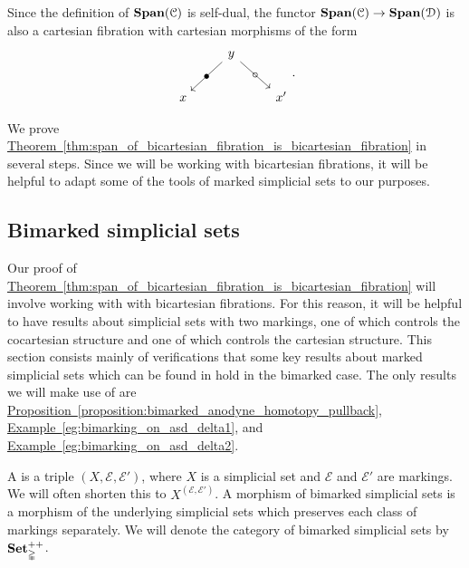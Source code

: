 \documentclass[main.tex]{subfiles}
\begin{document}
\begin{note}
  Since the definition of $\mathbf{Span}(\mathcal{C})$ is self-dual, the functor $\mathbf{Span}(\mathcal{C}) \to \mathbf{Span}(\mathcal{D})$ is also a cartesian fibration with cartesian morphisms of the form
  \begin{equation*}
    \begin{tikzcd}
      & y
      \arrow[dl, "\bullet" marking]
      \arrow[dr, "\circ" marking]
      \\
      x
      && x'
    \end{tikzcd}.
  \end{equation*}
\end{note}

We prove \hyperref[thm:span_of_bicartesian_fibration_is_bicartesian_fibration]{Theorem~\ref*{thm:span_of_bicartesian_fibration_is_bicartesian_fibration}} in several steps. Since we will be working with bicartesian fibrations, it will be helpful to adapt some of the tools of marked simplicial sets to our purposes.

\subsection{Bimarked simplicial sets}
\label{ssc:bimarked_simplicial_sets}

Our proof of \hyperref[thm:span_of_bicartesian_fibration_is_bicartesian_fibration]{Theorem~\ref*{thm:span_of_bicartesian_fibration_is_bicartesian_fibration}} will involve working with with bicartesian fibrations. For this reason, it will be helpful to have results about simplicial sets with two markings, one of which controls the cocartesian structure and one of which controls the cartesian structure. This section consists mainly of verifications that some key results about marked simplicial sets which can be found in \cite[Sec.\ 3.1]{highertopostheory} hold in the bimarked case. The only results we will make use of are \hyperref[proposition:bimarked_anodyne_homotopy_pullback]{Proposition~\ref*{proposition:bimarked_anodyne_homotopy_pullback}}, \hyperref[eg:bimarking_on_asd_delta1]{Example~\ref*{eg:bimarking_on_asd_delta1}}, and \hyperref[eg:bimarking_on_asd_delta2]{Example~\ref*{eg:bimarking_on_asd_delta2}}.

\begin{definition}
  A  is a triple $(X, \mathcal{E}, \mathcal{E}')$, where $X$ is a simplicial set and $\mathcal{E}$ and $\mathcal{E}'$ are markings. We will often shorten this to $X^{(\mathcal{E}, \mathcal{E}')}$. A morphism of bimarked simplicial sets is a morphism of the underlying simplicial sets which preserves each class of markings separately. We will denote the category of bimarked simplicial sets by $\mathbf{Set}_{\mathbb{\Delta}}^{++}$.
\end{definition}
\end{document}
